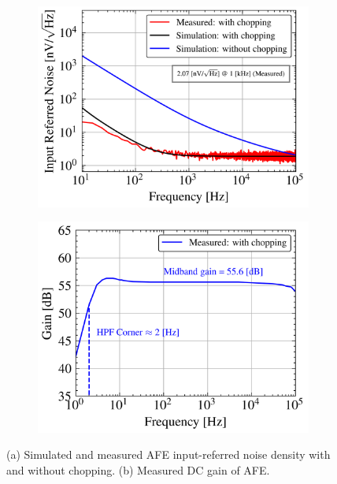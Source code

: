 \begin{figure}[!htbp]
        \centering
        \begin{subfigure}[c]{0.49\linewidth}
            \centering
            \includegraphics[width=\linewidth]{img/IRN_MEASURED.png}
            \caption[]%
            {{\small }}
            \label{fig:CCIA_IRN}
        \end{subfigure}
        \hfill
        \begin{subfigure}[c]{0.49\linewidth}  
            \centering 
            \includegraphics[width=\linewidth]{img/GAIN_MEASURED.png}
            \caption[]%
            {{\small }}
            \label{fig:CCIA_GAIN}
        \end{subfigure}
        \caption[ Don't write caption here ]
        {(a) Simulated and measured AFE input-referred noise density with and without chopping. \cite{srivastava20243d} (b) Measured DC gain of AFE. } 
        \label{fig:chip_char_IRN}
\end{figure}
